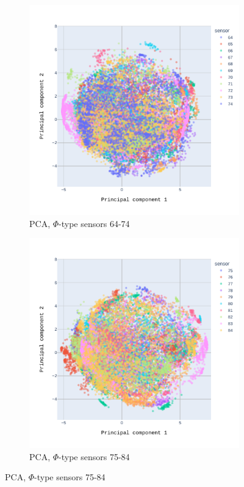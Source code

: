 


 \begin{figure}
\centering
\begin{subfigure}[b]{0.7\textwidth}
    \centering
    \includegraphics[width=\linewidth]{figures/chapter4/dimred/PCA_pedestals_phi_0.pdf}
    \caption{PCA, $\Phi$-type sensors 64-74}
  \label{plot:PCA_pedestals_0_phi}
  \end{subfigure}
\begin{subfigure}[b]{0.7\textwidth}
    \centering
    \includegraphics[width=\linewidth]{figures/chapter4/dimred/PCA_pedestals_phi_1.pdf}
    \caption{PCA, $\Phi$-type sensors 75-84}
   \label{plot:PCA_pedestals_1_phi}
  \end{subfigure}


\end{figure}
